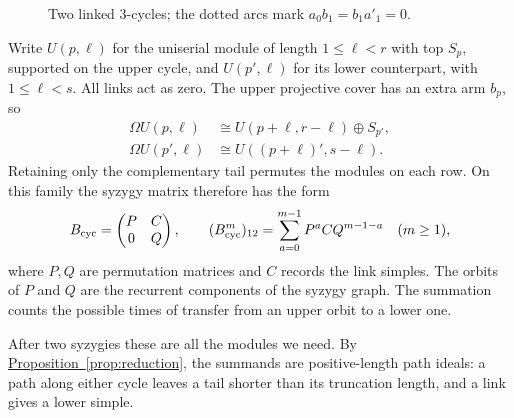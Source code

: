 \documentclass[reqno]{amsart}
\numberwithin{equation}{section}
\theoremstyle{definition}
\theoremstyle{remark}
\newcommand{\Om}{\Omega}
\newcommand{\propref}[1]{\hyperref[#1]{Proposition~\ref*{#1}}}
\begin{document}
\begin{figure}[ht]
\centering
{}
\caption{Two linked \(3\)-cycles; the dotted arcs mark \(a_0b_1=b_1a'_1=0\).}
\label{fig:doubled}
\end{figure}

Write \(U(p,\ell)\) for the uniserial module of length \(1\le\ell<r\) with top \(S_p\), supported on the upper cycle, and \(U(p',\ell)\) for its lower counterpart, with \(1\le\ell<s\). All links act as zero. The upper projective cover has an extra arm \(b_p\), so
\[
\begin{aligned}
 \Om U(p,\ell)&\cong U(p+\ell,r-\ell)\oplus S_{p'},\\
 \Om U(p',\ell)&\cong U((p+\ell)',s-\ell).
\end{aligned}
\]
Retaining only the complementary tail permutes the modules on each row. On this family the syzygy matrix therefore has the form
\[
 B_{\rm cyc}=\begin{pmatrix}P&C\\0&Q\end{pmatrix},\qquad
(B_{\rm cyc}^m)_{12}=\sum_{a=0}^{m-1}P^aCQ^{m-1-a}\quad(m\ge1),
\]
where \(P,Q\) are permutation matrices and \(C\) records the link simples. The orbits of \(P\) and \(Q\) are the recurrent components of the syzygy graph. The summation counts the possible times of transfer from an upper orbit to a lower one.

After two syzygies these are all the modules we need. By \propref{prop:reduction}, the summands are positive-length path ideals: a path along either cycle leaves a tail shorter than its truncation length, and a link gives a lower simple.
\end{document}
